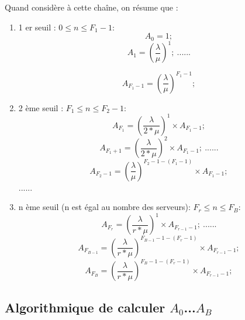 \noindent Quand considère à cette chaîne, on résume que :
\begin{enumerate}

\item 1 er seuil : $0\leq n\leq F_{1}-1$:
\begin{equation}
    A_{0} = 1 ; 
\end{equation}
\begin{equation}
    A_{1} = \left ( \frac{\lambda }{\mu }\right )^{1} ; \: ......
\end{equation}

\begin{equation}
    A_{F_{1}-1} = \left ( \frac{\lambda }{\mu }\right )^{F_{1}-1} ;
\end{equation}

\item 2 ème seuil : $F_{1}\leq n\leq F_{2}-1$:
\begin{equation}
    A_{F_{1}} = \left ( \frac{\lambda }{2*\mu }\right )^{1}\times A_{F_{1}-1} ;  
\end{equation}
\begin{equation}
    A_{F_{1}+1} = \left ( \frac{\lambda }{2*\mu }\right )^{2}\times A_{F_{1}-1} ; \: ......
\end{equation}
\begin{equation}
    A_{F_{2}-1} = \left ( \frac{\lambda }{\mu }\right )^{F_{2}-1-(F_{1}-1)}\times A_{F_{1}-1} ;
\end{equation}
......
\item n ème seuil (n est égal au nombre des serveurs): $F_{r}\leq n\leq F_{B}$:
\begin{equation}
    A_{F_{r}} = \left ( \frac{\lambda }{r*\mu }\right )^{1}\times A_{F_{r-1}-1} ; \: ......
\end{equation}
\begin{equation}
    A_{F_{B-1}} = \left ( \frac{\lambda }{r*\mu }\right)^{F_{B-1}-1-(F_{r}-1)}\times A_{F_{r-1}-1} ;
\end{equation}
\begin{equation}
    A_{F_{B}} = \left ( \frac{\lambda }{r*\mu }\right)^{F_{B}-1-(F_{r}-1)}\times A_{F_{r-1}-1} ;
\end{equation}
\end{enumerate}


\subsection{Algorithmique de calculer $A_{0}$...$A_{B}$}


